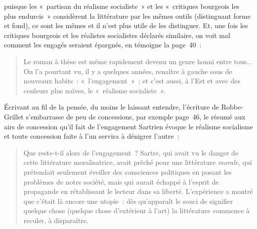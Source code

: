 \documentclass[12pt, a4paper]{article}
\begin{document}
puisque les «~partisan du réalisme socialiste~» et les «~critiques bourgeois les plus endurcis~» considèrent la littérature par les mêmes outils (distinguant forme et fond), ce sont les mêmes et il n'est plus utile de les distinguer. Et, une fois les critiques bourgeois et les réalistes socialistes déclarés similaire, on voit mal comment les engagés seraient épargnés, en témoigne la page~40~:
\begin{quote}
    Le roman à thèse est même rapidement devenu un genre honni entre tous... On l’a pourtant vu, il y a quelques années, renaître à gauche sous de nouveaux habits~: «~l’engagement~»~; et c’est aussi, à l’Est et avec des couleurs plus naïves, le «~réalisme socialiste~».
\end{quote}

Écrivant au fil de la pensée, du moins le laissant entendre, l'écriture de Robbe-Grillet s'embarrasse de peu de concessions, par exemple page~46, le résumé aux airs de concession qu'il fait de l'engagement Sartrien évoque le réalisme socialisme et toute concession faite à l'un servira à dénigrer l'autre~:
\begin{quote}
    Que reste-t-il alors de l’engagement~? Sartre, qui avait vu le danger de cette littérature moralisatrice, avait prêché pour une littérature \textit{morale}, qui prétendait seulement éveiller des consciences politiques en posant les problèmes de notre société, mais qui aurait échappé à l’esprit de propagande en rétablissant le lecteur dans sa liberté. L’expérience a montré que c’était là encore une utopie~: dès qu’apparaît le souci de signifier quelque chose (quelque chose d’extérieur à l’art) la littérature commence à reculer, à disparaître.
\end{quote}
\end{document}
